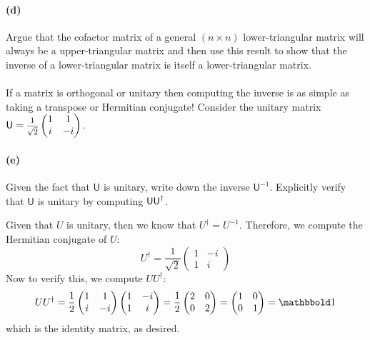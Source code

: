 \documentclass{article}
\begin{document}
\paragraph{(d)}		\extrapart
Argue that the cofactor matrix of a general $(n\times n)$ lower-triangular matrix will always be a upper-triangular matrix and then use this result to show that
the inverse of a lower-triangular matrix is itself a lower-triangular matrix.


\phline
\paragraph{}
If a matrix is orthogonal or unitary then computing the inverse is as simple as taking a transpose or Hermitian conjugate!
Consider the unitary matrix $\mathsf{U} = \fracsm{1}{\sqrt{2}}\twotwomat{1}{1}{i}{-i}$.

\paragraph{(e)}
Given the fact that $\mathsf{U}$ is unitary, write down the inverse $\mathsf{U}^{-1}$.  Explicitly verify that $\mathsf{U}$ is unitary by computing $\mathsf{UU}^{\dagger}$.

\begin{solution}
	Given that $U$ is unitary, then we know that $U^{\dagger} = U^{-1}$. Therefore, we compute the Hermitian
	conjugate of $U$:
	\[
		U^{\dagger} = \frac{1}{\sqrt{2} }\begin{pmatrix} 1 & -i\\1 & i \end{pmatrix} 
	\] 
	Now to verify this, we compute $U U^\dagger$:
	\[
		U U^\dagger = \frac{1}{2}\begin{pmatrix} 1 & 1\\i & -i \end{pmatrix} \begin{pmatrix} 1 & -i\\
		1 & i\end{pmatrix} = \frac{1}{2}\begin{pmatrix} 2 & 0\\0&2 \end{pmatrix} = \begin{pmatrix} 1& 0\\0&1
	\end{pmatrix} = \mathbbold 1
	\] 
	which is the identity matrix, as desired. 
\end{solution}
\phline
\end{document}
